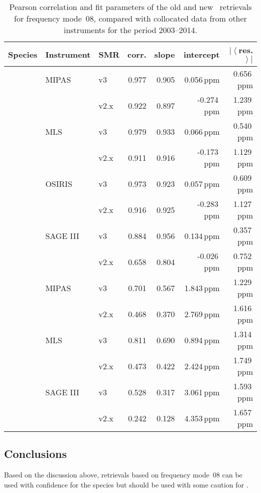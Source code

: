 \begin{table}[hbt]
\centering
\caption{Pearson correlation and fit parameters of the old and new \smr\
retrievals for frequency mode~08, compared with collocated data from other
instruments for the period 2003--2014.
}
\label{tab:fm08:stats}
\begin{tabular}{lllrrrr}
    \toprule
    \textbf{Species} & \textbf{Instrument} & \textbf{SMR} & \textbf{corr.} & \textbf{slope} & \textbf{intercept} & \textbf{$\left|\left<\right.\right.$res.$\left.\left.\right>\right|$} \\
    \midrule
    \chem{O3}   & MIPAS     & v3    & 0.977 & 0.905 & 0.056\,ppm    & 0.656\,ppm \\
                &           & v2.x  & 0.922 & 0.897 & -0.274\,ppm   & 1.239\,ppm \\
    \cline{2-7}
                & MLS       & v3    & 0.979 & 0.933 & 0.066\,ppm    & 0.540\,ppm \\
                &           & v2.x  & 0.911 & 0.916 & -0.173\,ppm   & 1.129\,ppm \\
    \cline{2-7}
                & OSIRIS    & v3    & 0.973 & 0.923 & 0.057\,ppm    & 0.609\,ppm \\
                &           & v2.x  & 0.916 & 0.925 & -0.283\,ppm   & 1.127\,ppm \\
    \cline{2-7}
                & SAGE III  & v3    & 0.884 & 0.956 & 0.134\,ppm    & 0.357\,ppm \\
                &           & v2.x  & 0.658 & 0.804 & -0.026\,ppm   & 0.752\,ppm \\
    \midrule
    \chem{H_2O} & MIPAS     & v3    & 0.701 & 0.567 & 1.843\,ppm    & 1.229\,ppm \\
                &           & v2.x  & 0.468 & 0.370 & 2.769\,ppm    & 1.616\,ppm \\
    \cline{2-7}
                & MLS       & v3    & 0.811 & 0.690 & 0.894\,ppm    & 1.314\,ppm \\
                &           & v2.x  & 0.473 & 0.422 & 2.424\,ppm    & 1.749\,ppm \\
    \cline{2-7}
                & SAGE III  & v3    & 0.528 & 0.317 & 3.061\,ppm    & 1.593\,ppm \\
                &           & v2.x  & 0.242 & 0.128 & 4.353\,ppm    & 1.657\,ppm \\
    \bottomrule
\end{tabular}
\end{table}

\subsection{Conclusions}
\label{sec:fm08:conclusions}
Based on the discussion above, retrievals based on frequency mode~08 can be
used with confidence for the species \chem{O_3} but should be used with some
caution for \chem{H_2O}.
